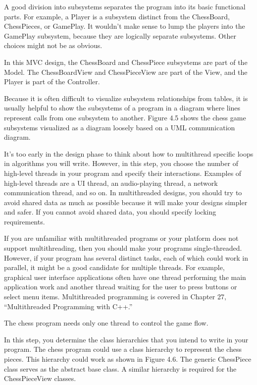 A good division into subsystems separates the program into its basic functional parts. For example, a Player is a subsystem distinct from the ChessBoard, ChessPieces, or GamePlay. It wouldn’t make sense to lump the players into the GamePlay subsystem, because they are logically separate subsystems. Other choices might not be as obvious.

In this MVC design, the ChessBoard and ChessPiece subsystems are part of the Model. The ChessBoardView and ChessPieceView are part of the View, and the Player is part of the Controller.

Because it is often difficult to visualize subsystem relationships from tables, it is usually helpful to show the subsystems of a program in a diagram where lines represent calls from one subsystem to another. Figure 4.5 shows the chess game subsystems visualized as a diagram loosely based on a UML communication diagram.



It’s too early in the design phase to think about how to multithread specific loops in algorithms you will write. However, in this step, you choose the number of high-level threads in your program and specify their interactions. Examples of high-level threads are a UI thread, an audio-playing thread, a network communication thread, and so on.
In multithreaded designs, you should try to avoid shared data as much as possible because it will make your designs simpler and safer. If you cannot avoid shared data, you should specify locking requirements.

If you are unfamiliar with multithreaded programs or your platform does not support multithreading, then you should make your programs single-threaded. However, if your program has several distinct tasks, each of which could work in parallel, it might be a good candidate for multiple threads. For example, graphical user interface applications often have one thread performing the main application work and another thread waiting for the user to press buttons or select menu items. Multithreaded programming is covered in Chapter 27, “Multithreaded Programming with C++.”

The chess program needs only one thread to control the game flow.


In this step, you determine the class hierarchies that you intend to write in your program. The chess program could use a class hierarchy to represent the chess pieces. This hierarchy could work as shown in Figure 4.6. The generic ChessPiece class serves as the abstract base class. A similar hierarchy is required for the ChessPieceView classes.

